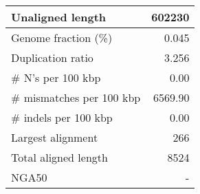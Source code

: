 \documentclass[12pt,a4paper]{article}
\begin{document}
\begin{table}[ht]
\begin{center}
\begin{tabular}{|l*{1}{|r}|}
Unaligned length & 602230 \\ \hline
Genome fraction (\%) & 0.045 \\ \hline
Duplication ratio & 3.256 \\ \hline
\# N's per 100 kbp & 0.00 \\ \hline
\# mismatches per 100 kbp & 6569.90 \\ \hline
\# indels per 100 kbp & 0.00 \\ \hline
Largest alignment & 266 \\ \hline
Total aligned length & 8524 \\ \hline
NGA50 & - \\ \hline
\end{tabular}
\end{center}
\end{table}
\end{document}
